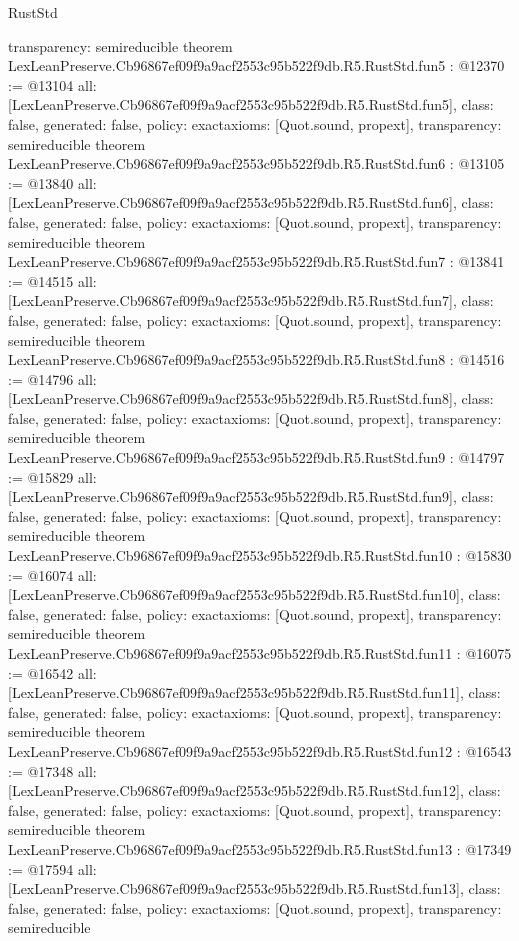 \begin{lexlean}{RustStd}
\begin{coremodule}
{  transparency: semireducible
}
theorem LexLeanPreserve.Cb96867ef09f9a9acf2553c95b522f9db.R5.RustStd.fun5 : @12370 := @13104 {
  all: [LexLeanPreserve.Cb96867ef09f9a9acf2553c95b522f9db.R5.RustStd.fun5],
  class: false,
  generated: false,
  policy: exact{axioms: [Quot.sound, propext]},
  transparency: semireducible
}
theorem LexLeanPreserve.Cb96867ef09f9a9acf2553c95b522f9db.R5.RustStd.fun6 : @13105 := @13840 {
  all: [LexLeanPreserve.Cb96867ef09f9a9acf2553c95b522f9db.R5.RustStd.fun6],
  class: false,
  generated: false,
  policy: exact{axioms: [Quot.sound, propext]},
  transparency: semireducible
}
theorem LexLeanPreserve.Cb96867ef09f9a9acf2553c95b522f9db.R5.RustStd.fun7 : @13841 := @14515 {
  all: [LexLeanPreserve.Cb96867ef09f9a9acf2553c95b522f9db.R5.RustStd.fun7],
  class: false,
  generated: false,
  policy: exact{axioms: [Quot.sound, propext]},
  transparency: semireducible
}
theorem LexLeanPreserve.Cb96867ef09f9a9acf2553c95b522f9db.R5.RustStd.fun8 : @14516 := @14796 {
  all: [LexLeanPreserve.Cb96867ef09f9a9acf2553c95b522f9db.R5.RustStd.fun8],
  class: false,
  generated: false,
  policy: exact{axioms: [Quot.sound, propext]},
  transparency: semireducible
}
theorem LexLeanPreserve.Cb96867ef09f9a9acf2553c95b522f9db.R5.RustStd.fun9 : @14797 := @15829 {
  all: [LexLeanPreserve.Cb96867ef09f9a9acf2553c95b522f9db.R5.RustStd.fun9],
  class: false,
  generated: false,
  policy: exact{axioms: [Quot.sound, propext]},
  transparency: semireducible
}
theorem LexLeanPreserve.Cb96867ef09f9a9acf2553c95b522f9db.R5.RustStd.fun10 : @15830 := @16074 {
  all: [LexLeanPreserve.Cb96867ef09f9a9acf2553c95b522f9db.R5.RustStd.fun10],
  class: false,
  generated: false,
  policy: exact{axioms: [Quot.sound, propext]},
  transparency: semireducible
}
theorem LexLeanPreserve.Cb96867ef09f9a9acf2553c95b522f9db.R5.RustStd.fun11 : @16075 := @16542 {
  all: [LexLeanPreserve.Cb96867ef09f9a9acf2553c95b522f9db.R5.RustStd.fun11],
  class: false,
  generated: false,
  policy: exact{axioms: [Quot.sound, propext]},
  transparency: semireducible
}
theorem LexLeanPreserve.Cb96867ef09f9a9acf2553c95b522f9db.R5.RustStd.fun12 : @16543 := @17348 {
  all: [LexLeanPreserve.Cb96867ef09f9a9acf2553c95b522f9db.R5.RustStd.fun12],
  class: false,
  generated: false,
  policy: exact{axioms: [Quot.sound, propext]},
  transparency: semireducible
}
theorem LexLeanPreserve.Cb96867ef09f9a9acf2553c95b522f9db.R5.RustStd.fun13 : @17349 := @17594 {
  all: [LexLeanPreserve.Cb96867ef09f9a9acf2553c95b522f9db.R5.RustStd.fun13],
  class: false,
  generated: false,
  policy: exact{axioms: [Quot.sound, propext]},
  transparency: semireducible
}
\end{coremodule}
\end{lexlean}
